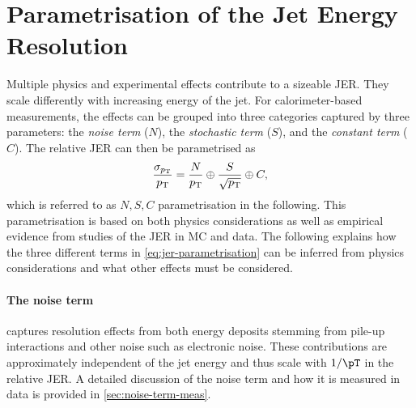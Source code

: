 


\section{Parametrisation of the Jet Energy Resolution}
\label{sec:jer}
Multiple physics and experimental effects contribute to a sizeable JER. They scale differently with increasing energy of the jet. For calorimeter-based measurements, the effects can be grouped into three categories captured by three parameters: the \emph{noise term} ($N$), the \emph{stochastic term} ($S$), and the \emph{constant term} ($C$).
The relative JER can then be parametrised as
\begin{equation}
    \label{eq:jer-parametrisation}
    \frac{\sigma_{p_{\rm T}}}{p_{\rm T}} = \frac{N}{p_{\rm T}} \oplus \frac{S}{\sqrt{p_{\rm T}}} \oplus C,
\end{equation}
which is referred to as $N, S, C$ parametrisation in the following.
This parametrisation is based on both physics considerations as well as empirical evidence from studies of the JER in MC and data.
The following explains how the three different terms in \cref{eq:jer-parametrisation} can be inferred from physics considerations and what other effects must be considered.

\paragraph{The noise term} captures resolution effects from both energy deposits stemming from pile-up interactions and other noise such as electronic noise.
These contributions are approximately independent of the jet energy and thus scale with $1 / \pT$ in the relative JER. A detailed discussion of the noise term and how it is measured in data is provided in \cref{sec:noise-term-meas}.

